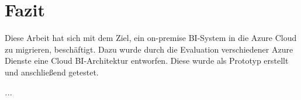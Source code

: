 \chapter{Fazit} \label{ch:zusammenfassung}
Diese Arbeit hat sich mit dem Ziel, ein on-premise BI-System in die Azure Cloud zu migrieren, beschäftigt. Dazu wurde durch die Evaluation verschiedener Azure Dienste eine Cloud BI-Architektur entworfen. Diese wurde als Prototyp erstellt und anschließend getestet.

\textit{...}